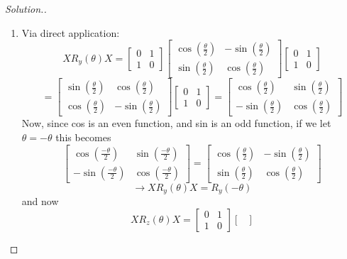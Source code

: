 \documentclass[12pt]{article}
\begin{document}
\begin{proof}[Solution.]~\\
\begin{enumerate}[label=(\alph*)]
\item Via direct application:
$$XR_y(\theta)X=\begin{bmatrix}
0 & 1\\
1 & 0
\end{bmatrix}\begin{bmatrix}
\cos\left(\frac{\theta}{2}\right) & -\sin\left(\frac{\theta}{2}\right)\\
\sin\left(\frac{\theta}{2}\right) & \cos\left(\frac{\theta}{2}\right)
\end{bmatrix}\begin{bmatrix}
0 & 1\\
1 & 0
\end{bmatrix}$$ 
$$=\begin{bmatrix}
\sin\left(\frac{\theta}{2}\right) & \cos\left(\frac{\theta}{2}\right)\\
\cos\left(\frac{\theta}{2}\right) & -\sin\left(\frac{\theta}{2}\right)
\end{bmatrix}\begin{bmatrix}
0 & 1\\
1 & 0
\end{bmatrix}=\begin{bmatrix}
\cos\left(\frac{\theta}{2}\right) & \sin\left(\frac{\theta}{2}\right)\\
-\sin\left(\frac{\theta}{2}\right) & \cos\left(\frac{\theta}{2}\right)
\end{bmatrix}$$
Now, since cos is an even function, and sin is an odd function, if we let
$\theta=-\theta$ this becomes
$$\begin{bmatrix}
\cos\left(\frac{-\theta}{2}\right) & \sin\left(\frac{-\theta}{2}\right)\\
-\sin\left(\frac{-\theta}{2}\right) & \cos\left(\frac{-\theta}{2}\right)
\end{bmatrix}=\begin{bmatrix}
\cos\left(\frac{\theta}{2}\right) & -\sin\left(\frac{\theta}{2}\right)\\
\sin\left(\frac{\theta}{2}\right) & \cos\left(\frac{\theta}{2}\right)
\end{bmatrix}$$
$$\to XR_y(\theta)X=R_y(-\theta)$$
and now
$$XR_z(\theta)X=\begin{bmatrix}
0 & 1\\
1 & 0
\end{bmatrix}\begin{bmatrix}

\end{bmatrix}$$
\end{enumerate}
\end{proof}
\end{document}
